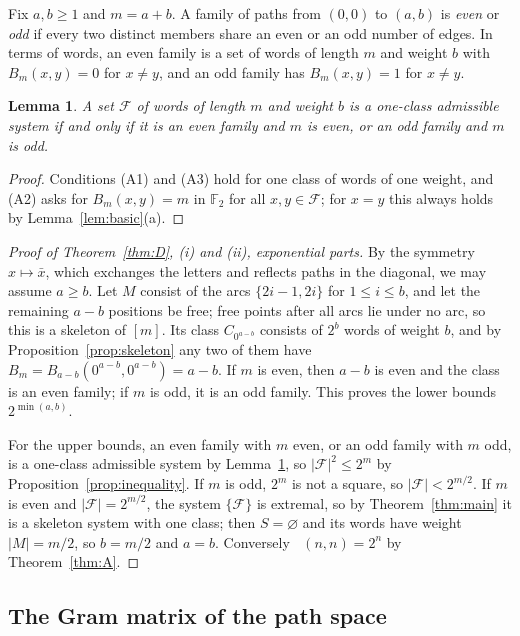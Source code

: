 \documentclass[11pt]{amsart}
\newtheorem{lemma}[theorem]{Lemma}
\theoremstyle{definition}
\theoremstyle{remark}
\numberwithin{equation}{section}
\newcommand{\F}{\mathbb{F}}
\newcommand{\cF}{\mathcal{F}}
\DeclareMathOperator{\Meven}{M_{ev}}
\begin{document}
Fix $a,b\ge1$ and $m=a+b$. A family of paths from $(0,0)$ to $(a,b)$ is \emph{even} or \emph{odd} if every two distinct members share an even or an odd number of edges. In terms of words, an even family is a set of words of length $m$ and weight $b$ with $B_m(x,y)=0$ for $x\ne y$, and an odd family has $B_m(x,y)=1$ for $x\ne y$.

\begin{lemma}\label{lem:oneclass}
A set $\cF$ of words of length $m$ and weight $b$ is a one-class admissible system if and only if it is an even family and $m$ is even, or an odd family and $m$ is odd.
\end{lemma}

\begin{proof}
Conditions (A1) and (A3) hold for one class of words of one weight, and (A2) asks for $B_m(x,y)=m$ in $\F_2$ for all $x,y\in\cF$; for $x=y$ this always holds by Lemma~\ref{lem:basic}(a).
\end{proof}

\begin{proof}[Proof of Theorem~\ref{thm:D}, \textup{(i)} and \textup{(ii)}, exponential parts]
By the symmetry $x\mapsto\bar x$, which exchanges the letters and reflects paths in the diagonal, we may assume $a\ge b$. Let $M$ consist of the arcs $\{2i-1,2i\}$ for $1\le i\le b$, and let the remaining $a-b$ positions be free; free points after all arcs lie under no arc, so this is a skeleton of $[m]$. Its class $C_{0^{a-b}}$ consists of $2^b$ words of weight $b$, and by Proposition~\ref{prop:skeleton} any two of them have $B_m=B_{a-b}(0^{a-b},0^{a-b})=a-b$. If $m$ is even, then $a-b$ is even and the class is an even family; if $m$ is odd, it is an odd family. This proves the lower bounds $2^{\min(a,b)}$.

For the upper bounds, an even family with $m$ even, or an odd family with $m$ odd, is a one-class admissible system by Lemma~\ref{lem:oneclass}, so $|\cF|^2\le 2^m$ by Proposition~\ref{prop:inequality}. If $m$ is odd, $2^m$ is not a square, so $|\cF|<2^{m/2}$. If $m$ is even and $|\cF|=2^{m/2}$, the system $\{\cF\}$ is extremal, so by Theorem~\ref{thm:main} it is a skeleton system with one class; then $S=\varnothing$ and its words have weight $|M|=m/2$, so $b=m/2$ and $a=b$. Conversely $\Meven(n,n)=2^n$ by Theorem~\ref{thm:A}.
\end{proof}

\subsection{The Gram matrix of the path space}
\end{document}

